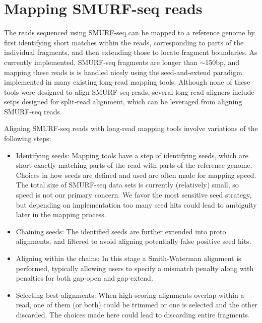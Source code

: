 \section{Mapping SMURF-seq reads}
The reads sequenced using SMURF-seq can be mapped to a reference genome
by first identifying short matches within the reads, corresponding to
parts of the individual fragments, and then extending those to locate
fragment boundaries. 
%
As currently implemented, SMURF-seq fragments are longer than
$\sim$150bp, and mapping these reads is is handled nicely using the
seed-and-extend paradigm implemented in many existing long-read mapping
tools. Although none of these tools were designed to align SMURF-seq
reads, several long read aligners include setps designed for split-read
alignment, which can be leveraged from aligning SMURF-seq reads.

Aligning SMURF-seq reads with long-read mapping tools involve variations
of the following steps:
\begin{itemize}
\item Identifying seeds: Mapping tools have a step of identifying seeds,
  which are short exactly matching parts of the read with parts of the
  reference genome. Choices in how seeds are defined and used are often
  made for mapping speed. The total size of SMURF-seq data sets is
  currently (relatively) small, so speed is not our primary concern. We
  favor the most sensitive seed strategy, but depending on implementation
  too many seed hits could lead to ambiguity later in the mapping process.
\item Chaining seeds: The identified seeds are further extended into
  proto alignments, and filtered to avoid aligning potentially false
  positive seed hits.
\item Aligning within the chains: In this stage a Smith-Waterman
  alignment is performed, typically allowing users to specify a mismatch
  penalty along with penalties for both gap-open and gap-extend.
\item Selecting best alignments: When high-scoring alignments overlap
  within a read, one of them (or both) could be trimmed or one is selected
  and the other discarded. The choices made here could lead to discarding
  entire fragments.  
\end{itemize}

